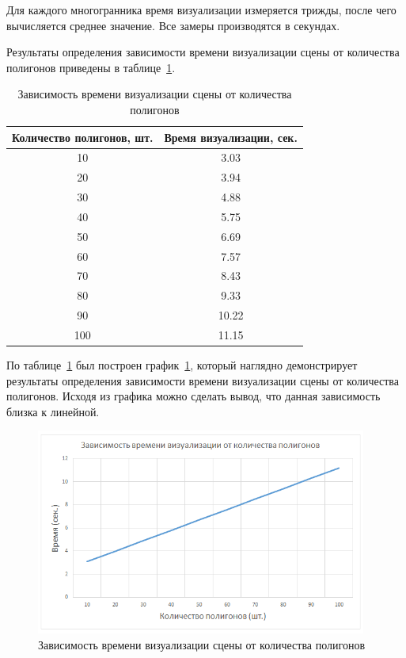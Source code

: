 Для каждого многогранника время визуализации измеряется трижды, после чего вычисляется среднее значение. Все замеры производятся в секундах.

Результаты определения зависимости времени визуализации сцены от количества полигонов приведены в таблице~\ref{tbl:research1}.

\begin{table}[h]
	\small
	\centering
	\caption{Зависимость времени визуализации сцены от количества полигонов}
	\begin{tabular}{|c|c|}
		\hline
		\textbf{Количество полигонов, шт.} & \textbf{Время визуализации, сек.} \\
		\hline
		10  & 3.03 \\
		20  & 3.94 \\
		30  & 4.88 \\
		40  & 5.75 \\
		50  & 6.69 \\
		60  & 7.57 \\
		70  & 8.43 \\
		80  & 9.33 \\
		90  & 10.22 \\
		100 & 11.15 \\
		\hline
	\end{tabular}
	\label{tbl:research1}
\end{table}


По таблице~\ref{tbl:research1} был построен график~\ref{fig:research1}, который наглядно демонстрирует результаты определения зависимости времени визуализации сцены от количества полигонов. Исходя из графика можно сделать вывод, что данная зависимость близка к линейной.

\begin{figure}[h] 
	\centering
	\includegraphics[width=0.97\textwidth]{images/research1.png}
	\caption{Зависимость времени визуализации сцены от количества полигонов} 
	\label{fig:research1} 
\end{figure}


